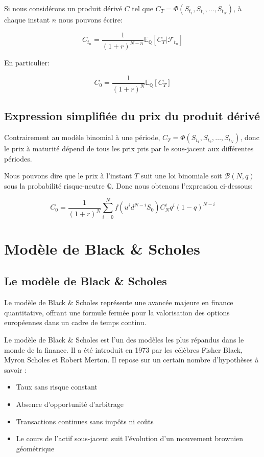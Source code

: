 \documentclass[12pt,a4paper]{report}
\begin{document}
Si nous considérons un produit dérivé $C$ tel que $C_T = \Phi(S_{t_1}, S_{t_2}, \ldots, S_{t_N})$, à chaque instant $n$ nous pouvons écrire:

\begin{equation*}
C_{t_n} = \frac{1}{(1 + r)^{N-n}}\mathbb{E}_{\mathbb{Q}} [C_T|\mathcal{F}_{t_n}]
\end{equation*}

En particulier:

\begin{equation*}
C_0 = \frac{1}{(1 + r)^N} \mathbb{E}_{\mathbb{Q}} [C_T]
\end{equation*}

\subsection{Expression simplifiée du prix du produit dérivé}

Contrairement au modèle binomial à une période, $C_T = \Phi(S_{t_1}, S_{t_2}, \ldots, S_{t_N})$, donc le prix à maturité dépend de tous les prix pris par le sous-jacent aux différentes périodes.

Nous pouvons dire que le prix à l'instant $T$ suit une loi binomiale soit $\mathcal{B}(N, q)$ sous la probabilité risque-neutre $\mathbb{Q}$. Donc nous obtenons l'expression ci-dessous:

\begin{equation*}
C_0 = \frac{1}{(1 + r)^N} \sum_{i=0}^{N} f(u^i d^{N-i}S_0)C_N^i q^i(1 - q)^{N-i}
\end{equation*}




\section{Modèle de Black \& Scholes}

\subsection{Le modèle de Black \& Scholes}


Le modèle de Black \& Scholes représente une avancée majeure en finance quantitative, offrant une formule fermée pour la valorisation des options européennes dans un cadre de temps continu.


Le modèle de Black \& Scholes est l'un des modèles les plus répandus dans le monde de la finance. Il a été introduit en 1973 par les célèbres Fisher Black, Myron Scholes et Robert Merton. Il repose sur un certain nombre d'hypothèses à savoir :
\begin{itemize}
    \item Taux sans risque constant
    \item Absence d'opportunité d'arbitrage
    \item Transactions continues sans impôts ni coûts
    \item Le cours de l'actif sous-jacent suit l'évolution d'un mouvement brownien géométrique
\end{itemize}
\end{document}
